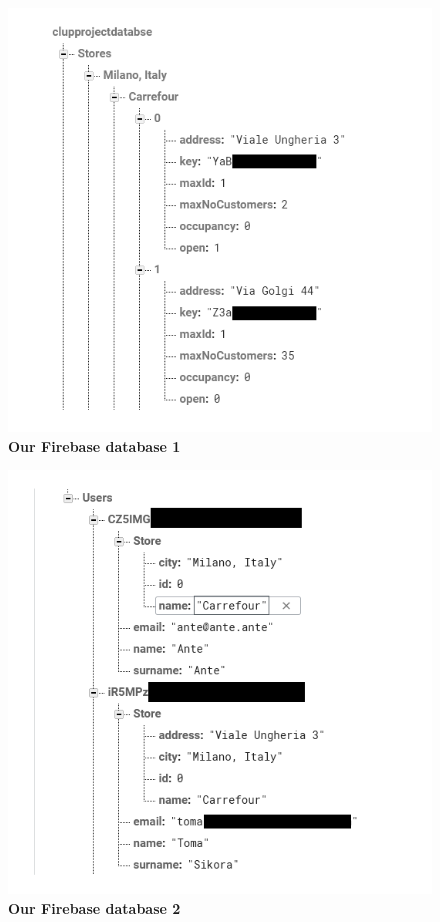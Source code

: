 \begin{figure}[H]
\centering
\includegraphics[width=\textwidth]{Images/Firebase1}
\caption{\label{fig:fire1}\textbf{Our Firebase database 1}}
\end{figure}
\begin{figure}[H]
\centering
\includegraphics[width=\textwidth]{Images/Firebase2}
\caption{\label{fig:fire2}\textbf{Our Firebase database 2}}
\end{figure}


